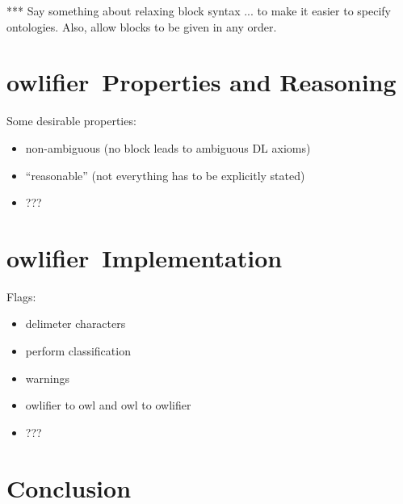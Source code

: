 \documentclass[preprint,number]{elsarticle}
\newcommand{\owlifier}{\textsf{owlifier}}
\begin{document}
*** Say something about relaxing block syntax ... to make it easier to
specify ontologies. Also, allow blocks to be given in any order.


\section{\owlifier\ Properties and Reasoning}
\label{sec:properties}


Some desirable properties: 
\begin{itemize}
\item non-ambiguous (no block leads to ambiguous DL axioms)
\item ``reasonable'' (not everything has to be explicitly stated)
\item ???
\end{itemize}

\section{\owlifier\ Implementation}
\label{sec:implementation}

Flags: 
\begin{itemize}
\item delimeter characters 
\item perform classification
\item warnings
\item owlifier to owl and owl to owlifier
\item ??? 
\end{itemize}


\section{Conclusion}
\label{sec:conclusion}



%


\end{document}
